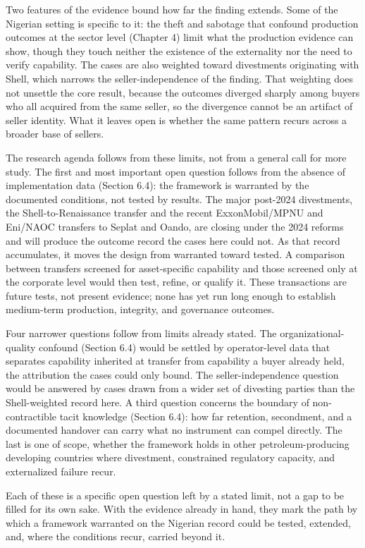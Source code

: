 \documentclass[twoside,fontset=lmodern]{mitthesis}
\begin{document}
Two features of the evidence bound how far the finding extends. Some of
the Nigerian setting is specific to it: the theft and sabotage that
confound production outcomes at the sector level (Chapter 4) limit what
the production evidence can show, though they touch neither the
existence of the externality nor the need to verify capability. The
cases are also weighted toward divestments originating with Shell, which
narrows the seller-independence of the finding. That weighting does not
unsettle the core result, because the outcomes diverged sharply among
buyers who all acquired from the same seller, so the divergence cannot
be an artifact of seller identity. What it leaves open is whether the
same pattern recurs across a broader base of sellers.

The research agenda follows from these limits, not from a general call
for more study. The first and most important open question follows from
the absence of implementation data (Section 6.4): the framework is
warranted by the documented conditions, not tested by results. The major
post-2024 divestments, the Shell-to-Renaissance transfer and the recent
ExxonMobil/MPNU and Eni/NAOC transfers to Seplat and Oando, are closing
under the 2024 reforms and will produce the outcome record the cases
here could not. As that record accumulates, it moves the design from
warranted toward tested. A comparison between transfers screened for
asset-specific capability and those screened only at the corporate level
would then test, refine, or qualify it. These transactions are future
tests, not present evidence; none has yet run long enough to establish
medium-term production, integrity, and governance outcomes.

Four narrower questions follow from limits already stated. The
organizational-quality confound (Section 6.4) would be settled by
operator-level data that separates capability inherited at transfer from
capability a buyer already held, the attribution the cases could only
bound. The seller-independence question would be answered by cases drawn
from a wider set of divesting parties than the Shell-weighted record
here. A third question concerns the boundary of non-contractible tacit
knowledge (Section 6.4): how far retention, secondment, and a documented
handover can carry what no instrument can compel directly. The last is
one of scope, whether the framework holds in other petroleum-producing
developing countries where divestment, constrained regulatory capacity,
and externalized failure recur.

Each of these is a specific open question left by a stated limit, not a
gap to be filled for its own sake. With the evidence already in hand,
they mark the path by which a framework warranted on the Nigerian record
could be tested, extended, and, where the conditions recur, carried
beyond it.
\end{document}
